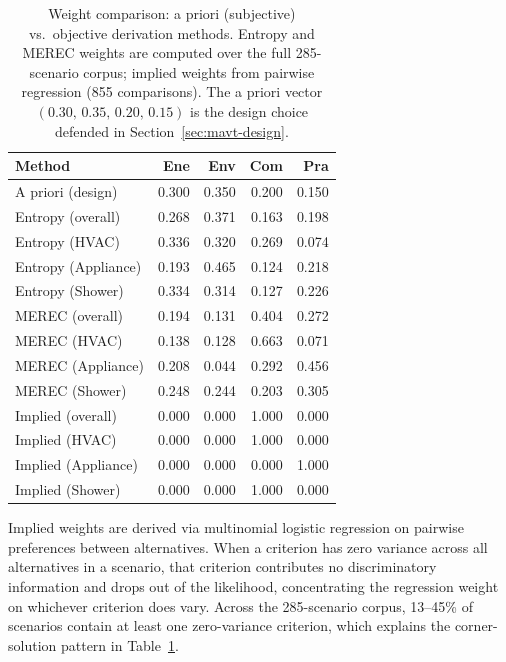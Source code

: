 \documentclass[final,3p,times]{elsarticle}
\begin{document}
\begin{table}[t]
\small
\centering
\renewcommand{\arraystretch}{1.15}
\caption{Weight comparison: a priori (subjective) vs.\ objective
derivation methods. Entropy and MEREC weights are computed over the
full 285-scenario corpus; implied weights from pairwise regression
(855 comparisons). The a priori vector
$(0.30,\,0.35,\,0.20,\,0.15)$ is the design choice defended in
Section~\ref{sec:mavt-design}.}
\label{tab:weight_comparison}
\begin{tabular}{@{}l rrrr@{}}
\toprule
\textbf{Method} & Ene & Env & Com & Pra \\
\midrule
A priori (design)         & 0.300 & 0.350 & 0.200 & 0.150 \\
Entropy (overall)         & 0.268 & 0.371 & 0.163 & 0.198 \\
Entropy (HVAC)            & 0.336 & 0.320 & 0.269 & 0.074 \\
Entropy (Appliance)       & 0.193 & 0.465 & 0.124 & 0.218 \\
Entropy (Shower)          & 0.334 & 0.314 & 0.127 & 0.226 \\
\midrule
MEREC (overall)           & 0.194 & 0.131 & 0.404 & 0.272 \\
MEREC (HVAC)              & 0.138 & 0.128 & 0.663 & 0.071 \\
MEREC (Appliance)         & 0.208 & 0.044 & 0.292 & 0.456 \\
MEREC (Shower)            & 0.248 & 0.244 & 0.203 & 0.305 \\
\midrule
Implied (overall)         & 0.000 & 0.000 & 1.000 & 0.000 \\
Implied (HVAC)            & 0.000 & 0.000 & 1.000 & 0.000 \\
Implied (Appliance)       & 0.000 & 0.000 & 0.000 & 1.000 \\
Implied (Shower)          & 0.000 & 0.000 & 1.000 & 0.000 \\
\bottomrule
\end{tabular}
\renewcommand{\arraystretch}{1.0}
\end{table}

Implied weights are derived via multinomial logistic regression on pairwise preferences between alternatives. When a criterion has zero variance across all alternatives in a scenario, that criterion contributes no discriminatory information and drops out of the likelihood, concentrating the regression weight on whichever criterion does vary. Across the 285-scenario corpus, 13--45\% of scenarios contain at least one zero-variance criterion, which explains the corner-solution pattern in Table~\ref{tab:weight_comparison}.
\end{document}
